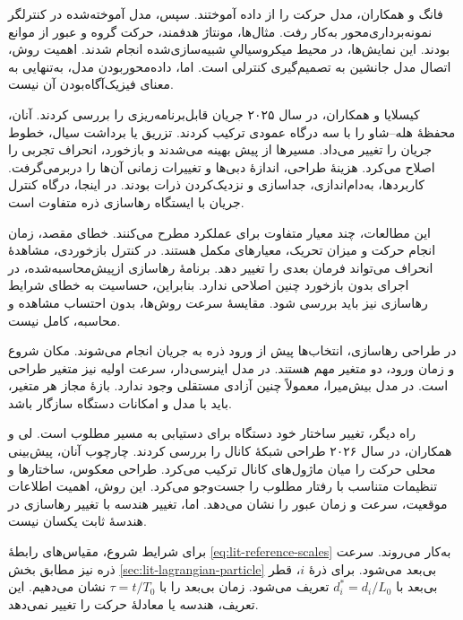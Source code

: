 فانگ و همکاران، مدل حرکت را از داده آموختند.
سپس، مدل آموخته‌شده در کنترلگر نمونه‌برداری‌محور به‌کار رفت.
مثال‌ها، مونتاژ هدفمند، حرکت گروه و عبور از موانع بودند.
این نمایش‌ها، در محیط میکروسیالیِ شبیه‌سازی‌شده انجام شدند.
اهمیت روش، اتصال مدل جانشین به تصمیم‌گیری کنترلی است.
اما، داده‌محوربودن مدل، به‌تنهایی به معنای فیزیک‌آگاه‌بودن آن نیست.
\cite{Fang2023DataDriven}

کیسلایا و همکاران، در سال ۲۰۲۵ جریان قابل‌برنامه‌ریزی را بررسی کردند.
آنان، محفظهٔ هله--شاو را با سه درگاه عمودی ترکیب کردند.
تزریق یا برداشت سیال، خطوط جریان را تغییر می‌داد.
مسیرها از پیش بهینه می‌شدند و بازخورد، انحراف تجربی را اصلاح می‌کرد.
هزینهٔ طراحی، اندازهٔ دبی‌ها و تغییرات زمانی آن‌ها را دربرمی‌گرفت.
کاربردها، به‌دام‌اندازی، جداسازی و نزدیک‌کردن ذرات بودند.
در اینجا، درگاه کنترل جریان با ایستگاه رهاسازی ذره متفاوت است.
\cite{Kislaya2025Programmable}

این مطالعات، چند معیار متفاوت برای عملکرد مطرح می‌کنند.
خطای مقصد، زمان انجام حرکت و میزان تحریک، معیارهای مکمل هستند.
در کنترل بازخوردی، مشاهدهٔ انحراف می‌تواند فرمان بعدی را تغییر دهد.
برنامهٔ رهاسازی ازپیش‌محاسبه‌شده، در اجرای بدون بازخورد چنین اصلاحی ندارد.
بنابراین، حساسیت به خطای شرایط رهاسازی نیز باید بررسی شود.
مقایسهٔ سرعت روش‌ها، بدون احتساب مشاهده و محاسبه، کامل نیست.

\label{sec:lit-release-design-variables}

در طراحی رهاسازی، انتخاب‌ها پیش از ورود ذره به جریان انجام می‌شوند.
مکان شروع و زمان ورود، دو متغیر مهم هستند.
در مدل اینرسی‌دار، سرعت اولیه نیز متغیر طراحی است.
در مدل بیش‌میرا، معمولاً چنین آزادی مستقلی وجود ندارد.
بازهٔ مجاز هر متغیر، باید با مدل و امکانات دستگاه سازگار باشد.

راه دیگر، تغییر ساختار خود دستگاه برای دستیابی به مسیر مطلوب است.
لی و همکاران، در سال ۲۰۲۶ طراحی شبکهٔ کانال را بررسی کردند.
چارچوب آنان، پیش‌بینی محلی حرکت را میان ماژول‌های کانال ترکیب می‌کرد.
طراحی معکوس، ساختارها و تنظیمات متناسب با رفتار مطلوب را جست‌وجو می‌کرد.
این روش، اهمیت اطلاعات موقعیت، سرعت و زمان عبور را نشان می‌دهد.
اما، تغییر هندسه با تغییر رهاسازی در هندسهٔ ثابت یکسان نیست.
\cite{Li2026ParticleArchitecture}

برای شرایط شروع، مقیاس‌های رابطهٔ \ref{eq:lit-reference-scales} به‌کار می‌روند.
سرعت ذره نیز مطابق بخش \ref{sec:lit-lagrangian-particle} بی‌بعد می‌شود.
برای ذرهٔ $i$، قطر بی‌بعد با $d_i^*=d_i/L_0$ تعریف می‌شود.
زمان بی‌بعد را با $\tau=t/T_0$ نشان می‌دهیم.
این تعریف، هندسه یا معادلهٔ حرکت را تغییر نمی‌دهد.

